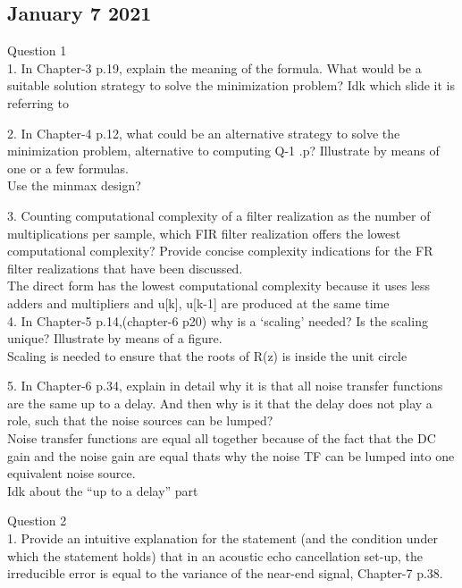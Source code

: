\documentclass[
  a4paper,
  ,captions=tableheading
]{scrartcl}
\begin{document}
\subsection{}\label{section-25}

\subsection{January 7 2021}\label{january-7-2021}

Question 1\\
1. In Chapter-3 p.19, explain the meaning of the formula. What would be
a suitable solution strategy to solve the minimization problem? Idk
which slide it is referring to

2. In Chapter-4 p.12, what could be an alternative strategy to solve the
minimization problem, alternative to computing Q-1 .p? Illustrate by
means of one or a few formulas.\\
Use the minmax design?

3. Counting computational complexity of a filter realization as the
number of multiplications per sample, which FIR filter realization
offers the lowest computational complexity? Provide concise complexity
indications for the FR filter realizations that have been discussed.\\
The direct form has the lowest computational complexity because it uses
less adders and multipliers and u{[}k{]}, u{[}k-1{]} are produced at the
same time\\
4. In Chapter-5 p.14,(chapter-6 p20) why is a `scaling' needed? Is the
scaling unique? Illustrate by means of a figure.\\
Scaling is needed to ensure that the roots of R(z) is inside the unit
circle

5. In Chapter-6 p.34, explain in detail why it is that all noise
transfer functions are the same up to a delay. And then why is it that
the delay does not play a role, such that the noise sources can be
lumped?\\
Noise transfer functions are equal all together because of the fact that
the DC gain and the noise gain are equal thats why the noise TF can be
lumped into one equivalent noise source.\\
Idk about the ``up to a delay'' part

Question 2\\
1. Provide an intuitive explanation for the statement (and the condition
under which the statement holds) that in an acoustic echo cancellation
set-up, the irreducible error is equal to the variance of the near-end
signal, Chapter-7 p.38.
\end{document}
